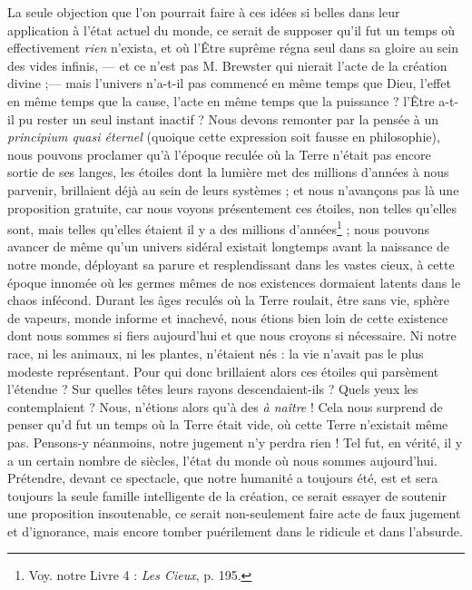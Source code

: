 \documentclass[a4paper, 11pt, oneside]{article}
\begin{document}
La seule objection que l'on pourrait faire à ces idées si belles dans leur application à l'état actuel du monde, ce serait de supposer qu'il fut un temps où effectivement \emph{rien} n'exista, et où l'Être suprême régna seul dans sa gloire au sein des vides infinis, --- et ce n'est pas M. Brewster qui nierait l'acte de la création divine ;--- mais l'univers n'a-t-il pas commencé en même temps que Dieu, l'effet en même temps que la cause, l'acte en même temps que la puissance ? l'Être a-t-il pu rester un seul instant inactif ? Nous devons remonter par la pensée à un \emph{principium quasi éternel} (quoique cette expression soit fausse en philosophie), nous pouvons proclamer qu'à l'époque reculée où la Terre n'était pas encore sortie de ses langes, les étoiles dont la lumière met des millions d'années à nous parvenir, brillaient déjà au sein de leurs systèmes ; et nous n'avançons pas là une proposition gratuite, car nous voyons présentement ces étoiles, non telles qu'elles sont, mais telles qu'elles étaient il y a des millions d'années\footnote{Voy. notre Livre 4 : \emph{Les Cieux}, p. 195.} ; nous pouvons avancer de même qu'un univers sidéral existait longtemps avant la naissance de notre monde, déployant sa parure et resplendissant dans les vastes cieux, à cette époque innomée où les germes mêmes de nos existences dormaient latents dans le chaos infécond. Durant les âges reculés où la Terre roulait, être sans vie, sphère de vapeurs, monde informe et inachevé, nous étions bien loin de cette existence dont nous sommes si fiers aujourd'hui et que nous croyons si nécessaire. Ni notre race, ni les animaux, ni les plantes, n'étaient nés : la vie n'avait pas le plus modeste représentant. Pour qui donc brillaient alors ces étoiles qui parsèment l'étendue ? Sur quelles têtes leurs rayons descendaient-ils ? Quels yeux les contemplaient ? Nous, n'étions alors qu'à des \emph{à naître} ! Cela nous surprend de penser qu'd fut un temps où la Terre était vide, où cette Terre n'existait même pas. Pensons-y néanmoins, notre jugement n'y perdra rien ! Tel fut, en vérité, il y a un certain nombre de siècles, l'état du monde où nous sommes aujourd'hui. Prétendre, devant ce spectacle, que notre humanité a toujours été, est et sera toujours la seule famille intelligente de la création, ce serait essayer de soutenir une proposition insoutenable, ce serait non-seulement faire acte de faux jugement et d'ignorance, mais encore tomber puérilement dans le ridicule et dans l'absurde.
\end{document}
